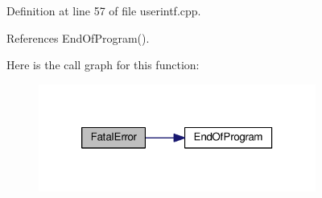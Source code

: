 Definition at line 57 of file userintf.\-cpp.



References End\-Of\-Program().



Here is the call graph for this function\-:\nopagebreak
\begin{figure}[H]
\begin{center}
\leavevmode
\includegraphics[width=258pt]{toolboxes_2rnd_2randomc_8h_a286fff8437e15b1a6ba210f84af9fce0_cgraph}
\end{center}
\end{figure}


